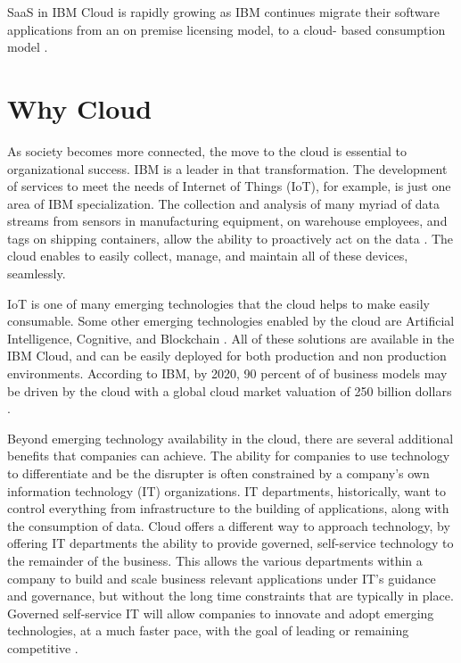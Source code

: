 \documentclass{acm_proc_article-sp}
\begin{document}
SaaS in IBM Cloud is rapidly growing as IBM continues migrate their
software applications from an on premise licensing model, to a cloud-
based consumption model \cite {hid-sp18-525-overview}.


\section{Why Cloud}

As society becomes more connected, the move to the cloud is essential to  organizational success.  IBM is a leader in that transformation.  
The development of services to meet the needs of Internet of Things (IoT), for example, is just one area of IBM specialization. The collection and analysis of many myriad of data streams from sensors in manufacturing equipment, on warehouse employees, and tags on shipping containers, allow the ability to proactively act on the data \cite{hid-sp18-525-winning}.  The cloud enables to easily collect, manage, and maintain all of these devices, seamlessly. 

IoT is one of many emerging technologies that the cloud helps to make easily consumable. Some other emerging technologies enabled by the cloud are Artificial Intelligence, Cognitive, and Blockchain \cite{hid-sp18-525-winning}.  All of these solutions are available in the IBM Cloud, and can be easily deployed for both production and non production environments.  According to IBM, by 2020, 90 percent of of business models may be driven by the cloud with a global cloud market valuation of 250 billion dollars  \cite{hid-sp18-525-winning}.

Beyond emerging technology availability in the cloud, there are several additional benefits that companies can achieve.  The ability for companies to use technology to differentiate and be the disrupter is often constrained by a company's own information technology (IT) organizations.  IT departments, historically, want to control everything from infrastructure to the building of applications, along with the consumption of data.  Cloud offers a different way to approach technology, by offering IT departments the ability to provide governed, self-service technology to the remainder of the business.  This allows the various departments within a company to build and scale business relevant applications under IT's guidance and governance, but without the long time constraints that are typically in place. Governed self-service IT will allow companies to innovate and adopt emerging technologies, at a much faster pace, with the goal of leading or remaining competitive \cite{hid-sp18-525-overview}.
\end{document}
